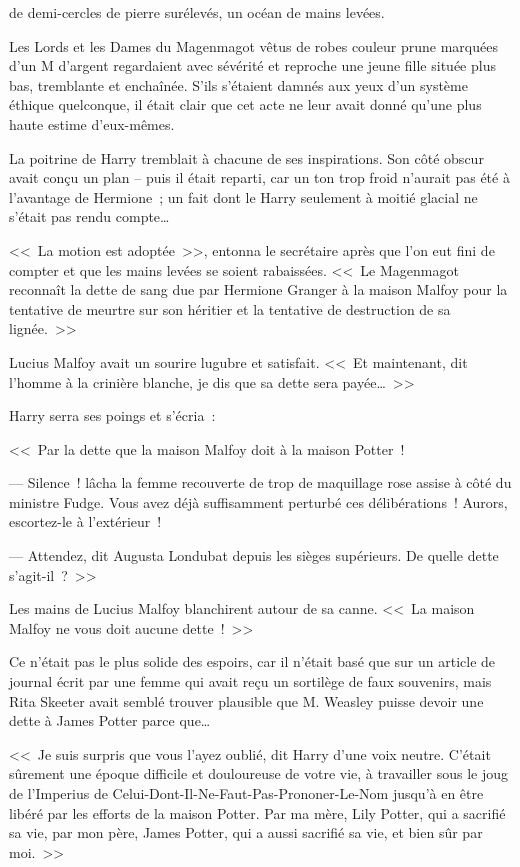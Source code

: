 
 de demi-cercles de pierre surélevés, un océan de mains levées.

\hplettrineextrapara
Les Lords et les Dames du Magenmagot vêtus de robes couleur prune marquées d'un M d'argent regardaient avec sévérité et reproche une jeune fille située plus bas, tremblante et enchaînée. S'ils s'étaient damnés aux yeux d'un système éthique quelconque, il était clair que cet acte ne leur avait donné qu'une plus haute estime d'eux-mêmes.

La poitrine de Harry tremblait à chacune de ses inspirations. Son côté obscur avait conçu un plan -- puis il était reparti, car un ton trop froid n'aurait pas été à l'avantage de Hermione~; un fait dont le Harry seulement à moitié glacial ne s'était pas rendu compte…

<<~La motion est adoptée~>>, entonna le secrétaire après que l'on eut fini de compter et que les mains levées se soient rabaissées. <<~Le Magenmagot reconnaît la dette de sang due par Hermione Granger à la maison Malfoy pour la tentative de meurtre sur son héritier et la tentative de destruction de sa lignée.~>>

Lucius Malfoy avait un sourire lugubre et satisfait. <<~Et maintenant, dit l'homme à la crinière blanche, je dis que sa dette sera payée…~>>

Harry serra ses poings et s'écria~:

<<~Par la dette que la maison Malfoy doit à la maison Potter~!

--- Silence~! lâcha la femme recouverte de trop de maquillage rose assise à côté du ministre Fudge. Vous avez déjà suffisamment perturbé ces délibérations~! Aurors, escortez-le à l'extérieur~!

--- Attendez, dit Augusta Londubat depuis les sièges supérieurs. De quelle dette s'agit-il~?~>>

Les mains de Lucius Malfoy blanchirent autour de sa canne. <<~La maison Malfoy ne vous doit aucune dette~!~>>

Ce n'était pas le plus solide des espoirs, car il n'était basé que sur un article de journal écrit par une femme qui avait reçu un sortilège de faux souvenirs, mais Rita Skeeter avait semblé trouver plausible que M. Weasley puisse devoir une dette à James Potter parce que…

<<~Je suis surpris que vous l'ayez oublié, dit Harry d'une voix neutre. C'était sûrement une époque difficile et douloureuse de votre vie, à travailler sous le joug de l'Imperius de Celui-Dont-Il-Ne-Faut-Pas-Prononer-Le-Nom jusqu'à en être libéré par les efforts de la maison Potter. Par ma mère, Lily Potter, qui a sacrifié sa vie, par mon père, James Potter, qui a aussi sacrifié sa vie, et bien sûr par moi.~>>

